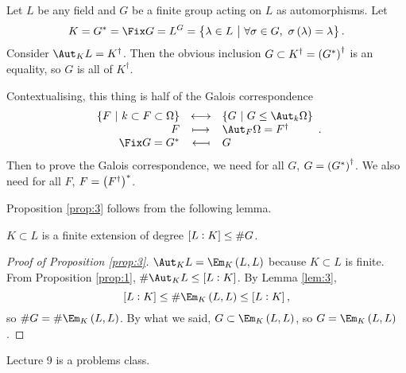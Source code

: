 \begin{proposition}
\label{prop:3}
Let $ L $ be any field and $ G $ be a finite group acting on $ L $ as automorphisms. Let
$$ K = G^* = \Fix G = L^G = \cbr{\lambda \in L \st \forall \sigma \in G, \ \sigma\br{\lambda} = \lambda}. $$
Consider $ \Aut_K L = K^\dagger $. Then the obvious inclusion $ G \subset K^\dagger = \br{G^*}^\dagger $ is an equality, so $ G $ is all of $ K^\dagger $.
\end{proposition}

\begin{remark*}
Contextualising, this thing is half of the Galois correspondence
$$ \bijection{\cbr{F \st k \subset F \subset \Omega}}{\cbr{G \st G \le \Aut_k \Omega}}{F}{\Aut_F \Omega = F^\dagger}{\Fix G = G^*}{G}. $$
Then to prove the Galois correspondence, we need for all $ G $, $ G = \br{G^*}^\dagger $. We also need for all $ F $, $ F = \br{F^\dagger}^* $.
\end{remark*}

Proposition \ref{prop:3} follows from the following lemma.

\begin{lemma}
\label{lem:3}
$ K \subset L $ is a finite extension of degree $ \sbr{L : K} \le \#G $.
\end{lemma}

\begin{proof}[Proof of Proposition \ref{prop:3}]
$ \Aut_K L = \Em_K\br{L, L} $ because $ K \subset L $ is finite. From Proposition \ref{prop:1}, $ \#\Aut_K L \le \sbr{L : K} $. By Lemma \ref{lem:3},
$$ \sbr{L : K} \le \#\Em_K\br{L, L} \le \sbr{L : K}, $$
so $ \#G = \#\Em_K\br{L, L} $. By what we said, $ G \subset \Em_K\br{L, L} $, so $ G = \Em_K\br{L, L} $.
\end{proof}


Lecture 9 is a problems class.

\pagebreak


